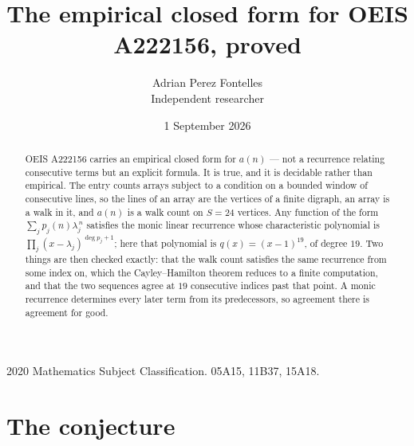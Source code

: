 \documentclass[11pt,a4paper]{article}
\title{The empirical closed form for OEIS A222156, proved}
\author{Adrian Perez Fontelles\\ \small Independent researcher}
\date{1 September 2026}
\theoremstyle{plain}
\theoremstyle{definition}
\begin{document}
\maketitle

\begin{abstract}
OEIS A222156 carries an empirical closed form for $a(n)$ --- not a recurrence relating
consecutive terms but an explicit formula. It is true, and it is decidable rather than
empirical. The entry counts arrays subject to a condition on a bounded window of consecutive lines, so the lines of an array are the
vertices of a finite digraph, an array is a walk in it, and $a(n)$ is a walk count on
$S=24$ vertices. Any function of the form $\sum_j p_j(n)\lambda_j^{\,n}$ satisfies the
monic linear recurrence whose characteristic polynomial is
$\prod_j(x-\lambda_j)^{\deg p_j+1}$; here that polynomial is $q(x)=(x-1)^{19}$, of degree
$19$. Two things are then checked exactly: that the walk count satisfies the same
recurrence from some index on, which the Cayley--Hamilton theorem reduces to a finite
computation, and that the two sequences agree at $19$ consecutive indices past that
point. A monic recurrence determines every later term from its predecessors, so agreement
there is agreement for good.
\end{abstract}

\noindent\small 2020 Mathematics Subject Classification. 05A15, 11B37, 15A18.\normalsize

\section{The conjecture}
\end{document}
